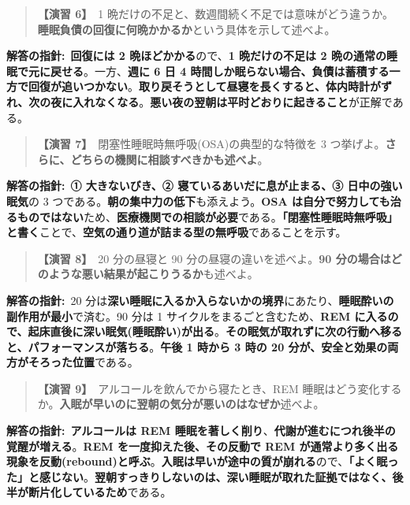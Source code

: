 \documentclass{article}
\begin{document}
\begin{quote}
\textbf{【演習 6】}\ 1 晩だけの不足と、数週間続く不足では意味がどう違うか。\textbf{睡眠負債の回復に何晩かかるか}という具体を示して述べよ。
\end{quote}

\textbf{解答の指針:}\ \textbf{回復には 2 晩ほどかかる}ので、\textbf{1 晩だけの不足は 2 晩の通常の睡眠で元に戻せる}。一方、\textbf{週に 6 日 4 時間しか眠らない場合、負債は蓄積する一方で回復が追いつかない}。\textbf{取り戻そうとして昼寝を長くすると、体内時計がずれ、次の夜に入れなくなる}。\textbf{悪い夜の翌朝は平时どおりに起きること}が正解である。

\begin{quote}
\textbf{【演習 7】}\ 閉塞性睡眠時無呼吸(OSA)の典型的な特徴を 3 つ挙げよ。\textbf{さらに、どちらの機関に相談すべきかも述べよ}。
\end{quote}

\textbf{解答の指針:}\ \textbf{① 大きないびき、② 寝ているあいだに息が止まる、③ 日中の強い眠気}の 3 つである。\textbf{朝の集中力の低下}も添えよう。\textbf{OSA は自分で努力しても治るものではない}ため、\textbf{医療機関での相談が必要}である。\textbf{「閉塞性睡眠時無呼吸」と書く}ことで、\textbf{空気の通り道が詰まる型の無呼吸}であることを示す。

\begin{quote}
\textbf{【演習 8】}\ 20 分の昼寝と 90 分の昼寝の違いを述べよ。\textbf{90 分の場合はどのような悪い結果が起こりうるか}も述べよ。
\end{quote}

\textbf{解答の指針:}\ 20 分は\textbf{深い睡眠に入るか入らないかの境界}にあたり、\textbf{睡眠酔いの副作用が最小}で済む。90 分は 1 サイクルをまるごと含むため、\textbf{REM に入るので、起床直後に深い眠気(睡眠酔い)が出る}。\textbf{その眠気が取れずに次の行動へ移ると、パフォーマンスが落ちる}。\textbf{午後 1 時から 3 時の 20 分が、安全と効果の両方がそろった位置}である。

\begin{quote}
\textbf{【演習 9】}\ アルコールを飲んでから寝たとき、REM 睡眠はどう変化するか。\textbf{入眠が早いのに翌朝の気分が悪いのはなぜか}述べよ。
\end{quote}

\textbf{解答の指針:}\ \textbf{アルコールは REM 睡眠を著しく削り}、\textbf{代謝が進むにつれ後半の覚醒が増える}。\textbf{REM を一度抑えた後、その反動で REM が通常より多く出る現象を反動(rebound)と呼ぶ}。\textbf{入眠は早いが途中の質が崩れる}ので、\textbf{「よく眠った」と感じない}。\textbf{翌朝すっきりしないのは、深い睡眠が取れた証拠ではなく、後半が断片化しているため}である。
\end{document}

